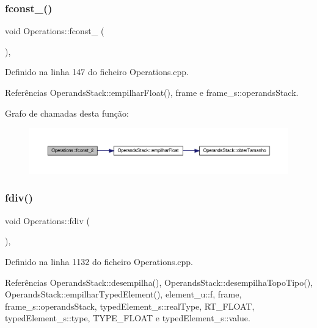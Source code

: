 \subsubsection{\texorpdfstring{fconst\+\_()}{fconst\_2()}}
{\footnotesize\ttfamily void Operations\+::fconst\+\_ (\begin{DoxyParamCaption}{ }\end{DoxyParamCaption})\hspace{0.3cm}{\ttfamily [static]}, {\ttfamily [private]}}



Definido na linha 147 do ficheiro Operations.\+cpp.



Referências Operands\+Stack\+::empilhar\+Float(), frame e frame\+\_\+s\+::operands\+Stack.

Grafo de chamadas desta função\+:\nopagebreak
\begin{figure}[H]
\begin{center}
\leavevmode
\includegraphics[width=350pt]{classOperations_a1857c1a0e34d6f91dcb7166ca6d678a2_cgraph}
\end{center}
\end{figure}
\mbox{\label{classOperations_a85d79532189d640a6d02c99f204d2229}} 
\subsubsection{\texorpdfstring{fdiv()}{fdiv()}}
{\footnotesize\ttfamily void Operations\+::fdiv (\begin{DoxyParamCaption}{ }\end{DoxyParamCaption})\hspace{0.3cm}{\ttfamily [static]}, {\ttfamily [private]}}



Definido na linha 1132 do ficheiro Operations.\+cpp.



Referências Operands\+Stack\+::desempilha(), Operands\+Stack\+::desempilha\+Topo\+Tipo(), Operands\+Stack\+::empilhar\+Typed\+Element(), element\+\_\+u\+::f, frame, frame\+\_\+s\+::operands\+Stack, typed\+Element\+\_\+s\+::real\+Type, R\+T\+\_\+\+F\+L\+O\+AT, typed\+Element\+\_\+s\+::type, T\+Y\+P\+E\+\_\+\+F\+L\+O\+AT e typed\+Element\+\_\+s\+::value.

